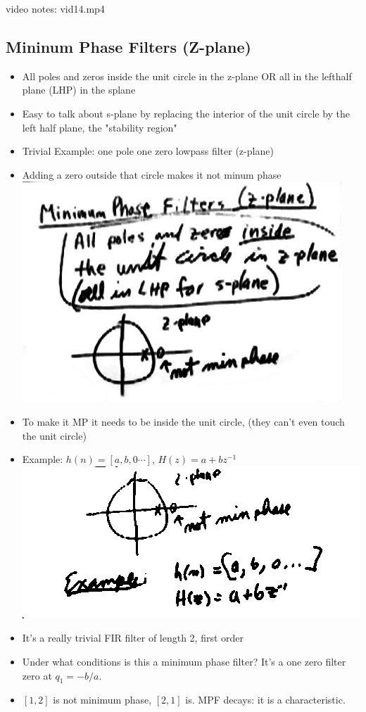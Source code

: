 video notes: vid14.mp4
\subsection*{Mininum Phase Filters (Z-plane)}
\begin{itemize}
\item{All poles and zeros inside the unit circle in the z-plane 
OR all in the lefthalf plane (LHP) in the splane}
\item{Easy to talk about s-plane by replacing the interior of the unit circle by
the left half plane, the "stability region"}

\item{
Trivial Example: one pole one zero lowpass filter (z-plane)
}
\item{
    Adding a zero outside that circle makes it not minum phase
    \includegraphics[scale=0.4]{frames/23a}
}
\item{
    To make it MP it needs to be inside the unit circle, (they can't even
touch the unit circle)
}


\item{
Example:  $h(n) = [a, b, 0\cdots]$, $H(z) = a + bz^{-1}$
    \includegraphics[scale=0.4]{frames/23b}

}
\item{
It's a really trivial FIR filter of length 2, first order
}
\item{
Under what conditions is this a minimum phase filter? It's a one
zero filter zero at $q_1 = -b/a$.
}
\item{
$[1, 2]$ is not minimum phase, $[2, 1]$ is. MPF decays: it is a characteristic.
}
\end{itemize}
